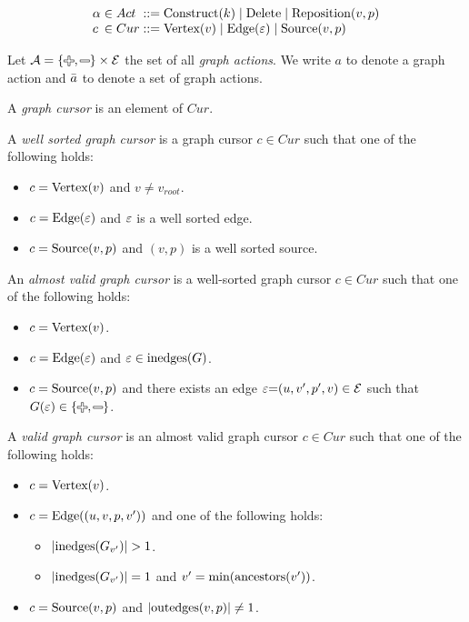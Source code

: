 \[
  \arraycolsep=0pt
  \begin{array}{lcllll}
    \alpha & {}\in{} & Act & {}::={} &
      \Construct{k}
      \mid \Delete
      \mid \Reposition{v}{p}
    \\
    c & {}\in{} & Cur & {}::={} &
      \CVertex{v}
      \mid \CEdge{\e}
      \mid \CSource{v}{p}
    \\
  \end{array}
\]

Let $\A = \SetOf{\Plus, \Minus} \times \E$ the set of all \emph{graph actions}.
We write $a$ to denote a graph action and $\bar{a}$ to denote a set of graph actions.

\begin{definition}
  A \emph{graph cursor} is an element of $Cur$.
\end{definition}

\begin{definition}
  A \emph{well sorted graph cursor} is a graph cursor $c \in Cur$
  such that one of the following holds:
  \begin{itemize}
    \item $c = \text{Vertex}\mathopen{}\left(v\right)\mathclose{}$ and $v \neq v_{root}$.
    \item $c = \text{Edge}\mathopen{}\left(\varepsilon\right)\mathclose{}$ and $\varepsilon$ is a well sorted edge.
    \item $c = \text{Source}\mathopen{}\left(v, p\right)\mathclose{}$ and $(v, p)$ is a well sorted source.
  \end{itemize}
\end{definition}

\begin{definition}
  An \emph{almost valid graph cursor} is a well-sorted graph cursor $c \in Cur$
  such that one of the following holds:
  \begin{itemize}
    \item $c = \text{Vertex}\mathopen{}\left(v\right)\mathclose{}$.
    \item $c = \text{Edge}\mathopen{}\left(\varepsilon\right)\mathclose{}$ and $\varepsilon \in \text{inedges}\mathopen{}\left(G\right)\mathclose{}$.
    \item $c = \text{Source}\mathopen{}\left(v, p\right)\mathclose{}$
      and there exists an edge $\varepsilon{=}(u, v', p', v) \in \mathcal{E}$
      such that $G(\e) \in \SetOf{\Plus, \Minus}$.
  \end{itemize}
\end{definition}

\begin{definition}
  A \emph{valid graph cursor} is an almost valid graph cursor $c \in Cur$
  such that one of the following holds:
  \begin{itemize}
    \item $c = \text{Vertex}\mathopen{}\left(v\right)\mathclose{}$.
    \item $c = \text{Edge}\mathopen{}\left((u, v, p, v')\right)\mathclose{}$ and one of the following holds:
    \begin{itemize}
      \item $\left\lvert\text{inedges}\mathopen{}\left(G_{v'}\right)\mathclose{}\right\rvert > 1$.
      \item $\left\lvert\text{inedges}\mathopen{}\left(G_{v'}\right)\mathclose{}\right\rvert = 1$ and $v' = \operatorname{\text{min}}\mathopen{}\left(\operatorname{\text{ancestors}}\mathopen{}\left(v'\right)\mathclose{}\right)\mathclose{}$.
    \end{itemize}
    \item $c = \text{Source}\mathopen{}\left(v, p\right)\mathclose{}$ and $\left\lvert\operatorname{\text{outedges}}\mathopen{}\left(v, p\right)\mathclose{}\right\rvert \neq 1$.
  \end{itemize}
\end{definition}

